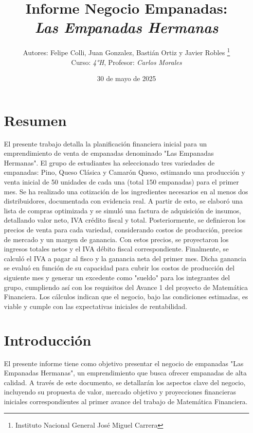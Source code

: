 \documentclass[12pt]{article}
\title{Informe Negocio Empanadas: \\
\textit{Las Empanadas Hermanas}} %
\author{Autores: Felipe Colli, Juan Gonzalez, Bastián Ortiz y Javier Robles \thanks{Instituto Nacional General José Miguel Carrera} \\
  Curso: \textit{4°H}, Profesor: \textit{Carlos Morales}} %
\date{30 de mayo de 2025} %
\begin{document}
\maketitle
\newpage

\tableofcontents
\newpage

\section{Resumen} %
El presente trabajo detalla la planificación financiera inicial para un emprendimiento de venta de empanadas denominado "Las Empanadas Hermanas". El grupo de estudiantes ha seleccionado tres variedades de empanadas: Pino, Queso Clásica y Camarón Queso, estimando una producción y venta inicial de 50 unidades de cada una (total 150 empanadas) para el primer mes.
Se ha realizado una cotización de los ingredientes necesarios en al menos dos distribuidores, documentada con evidencia real. A partir de esto, se elaboró una lista de compras optimizada y se simuló una factura de adquisición de insumos, detallando valor neto, IVA crédito fiscal y total.
Posteriormente, se definieron los precios de venta para cada variedad, considerando costos de producción, precios de mercado y un margen de ganancia. Con estos precios, se proyectaron los ingresos totales netos y el IVA débito fiscal correspondiente.
Finalmente, se calculó el IVA a pagar al fisco y la ganancia neta del primer mes. Dicha ganancia se evaluó en función de su capacidad para cubrir los costos de producción del siguiente mes y generar un excedente como "sueldo" para los integrantes del grupo, cumpliendo así con los requisitos del Avance 1 del proyecto de Matemática Financiera. Los cálculos indican que el negocio, bajo las condiciones estimadas, es viable y cumple con las expectativas iniciales de rentabilidad.

\newpage

\section{Introducción} %
El presente informe tiene como objetivo presentar el negocio de empanadas "Las Empanadas Hermanas", un emprendimiento que busca ofrecer empanadas de alta calidad. A través de este documento, se detallarán los aspectos clave del negocio, incluyendo su propuesta de valor, mercado objetivo y proyecciones financieras iniciales correspondientes al primer avance del trabajo de Matemática Financiera. \\
\end{document}
